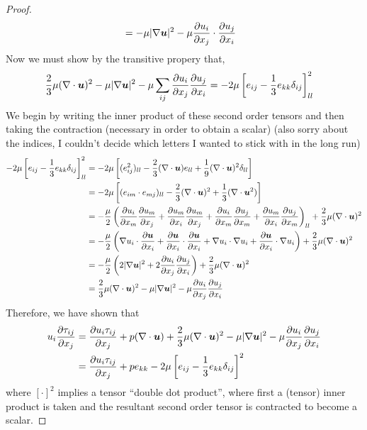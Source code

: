 \documentclass{article}
\begin{document}
\begin{proof}
\begin{align*}
        &= -\mu |\nabla\boldsymbol{u}|^2 - \mu\frac{\partial u_i}{\partial x_j}\cdot\frac{\partial u_j}{\partial x_i}
    \end{align*}
    Now we must show by the transitive propery that,
    \begin{align*}
        \frac{2}{3}\mu(\nabla \cdot{\boldsymbol{u}})^2 - \mu |\nabla\boldsymbol{u}|^2 -
        \mu\sum_{ij}\frac{\partial u_i}{\partial x_j}\frac{\partial u_j}{\partial x_i} &= -
        2\mu\left[e_{ij} - \frac{1}{3}e_{kk}\delta_{ij}\right]^2_{ll}
    \end{align*}
    We begin by writing the inner product of these second order tensors and then
    taking the contraction (necessary in order to obtain a scalar) (also sorry
    about the indices, I couldn't decide which letters I wanted to stick with in
    the long run)
    \begin{align*}
        -2\mu\left[e_{ij} -
        \frac{1}{3}e_{kk}\delta_{ij}\right]^2_{ll}&=
        -2\mu\left[(e_{ij}^2)_{ll}
        - \frac{2}{3}(\nabla \cdot{\boldsymbol{u}})e_{ll} +
        \frac{1}{9}(\nabla \cdot{\boldsymbol{u}})^2\delta_{ll}\right]\\
        &=-2\mu\left[(e_{im}\cdot e_{mj})_{ll}
        -\frac{2}{3}(\nabla \cdot{\boldsymbol{u}})^2 + \frac{1}{3}(\nabla \cdot{\boldsymbol{u}}^2)\right]\\
        &= -\frac{\mu}{2}\left(\frac{\partial u_i}{\partial x_m}\frac{\partial u_m}{\partial x_j} + \frac{\partial u_m}{\partial x_i}\frac{\partial u_m}{\partial x_j} +
        \frac{\partial u_i}{\partial x_m}\frac{\partial u_j}{\partial x_m} + \frac{\partial u_m}{\partial x_i}\frac{\partial u_j}{\partial x_m}\right)_{ll} +
        \frac{2}{3}\mu(\nabla \cdot{\boldsymbol{u}})^2\\
        &=-\frac{\mu}{2}\left(\nabla u_i\cdot \frac{\partial \boldsymbol{u}}{\partial x_i} +
        \frac{\partial \boldsymbol{u}}{\partial x_i}\cdot\frac{\partial \boldsymbol{u}}{\partial x_i} + \nabla u_i\cdot\nabla u_i +
        \frac{\partial \boldsymbol{u}}{\partial x_i}\cdot\nabla u_i\right) + \frac{2}{3}\mu(\nabla \cdot{\boldsymbol{u}})^2\\
        &=-\frac{\mu}{2}\left(2|\nabla\boldsymbol{u}|^2 +
        2\frac{\partial u_i}{\partial x_j}\frac{\partial u_j}{\partial x_i}\right) + \frac{2}{3}\mu(\nabla \cdot{\boldsymbol{u}})^2\\
        &= \frac{2}{3}\mu(\nabla \cdot{\boldsymbol{u}})^2  -\mu|\nabla\boldsymbol{u}|^2 - \mu\frac{\partial u_i}{\partial x_j}\frac{\partial u_j}{\partial x_i}
    \end{align*}
    Therefore, we have shown that 
    \begin{align*}
        u_i\frac{\partial \tau_{ij}}{\partial x_j} &= \frac{\partial u_i\tau_{ij}}{\partial x_j} + p(\nabla \cdot{\boldsymbol{u}}) +
        \frac{2}{3}\mu(\nabla \cdot{\boldsymbol{u}})^2 - \mu|\nabla\boldsymbol{u}|^2 -
        \mu\frac{\partial u_i}{\partial x_j}\frac{\partial u_j}{\partial x_i}\\
        &= \frac{\partial u_i\tau_{ij}}{\partial x_j} + pe_{kk} - 2\mu\left[e_{ij} -
        \frac{1}{3}e_{kk}\delta_{ij}\right]^2
    \end{align*}
    where $[\cdot]^2$ implies a tensor ``double dot product'', where first a
    (tensor) inner
    product is taken and the resultant
    second order tensor is contracted to become a scalar. 
\end{proof}
\end{document}
